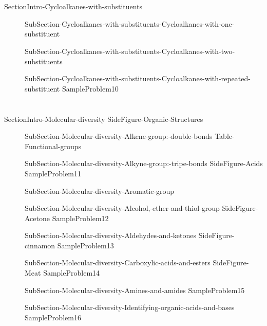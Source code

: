 \documentclass[main.tex]{subfiles}
\begin{document}
\section{\color{blue!30!black}{Cycloalkanes with substituents}}
{SectionIntro-Cycloalkanes-with-substituents}
\sloppy
\begin{description}
\item[]{SubSection-Cycloalkanes-with-substituents-Cycloalkanes-with-one-substituent}
\item[] {SubSection-Cycloalkanes-with-substituents-Cycloalkanes-with-two-substituents}
\item[]{SubSection-Cycloalkanes-with-substituents-Cycloalkanes-with-repeated-substituent}
{SampleProblem10}
\end{description}




\newpage
\section{\color{blue!30!black}{Molecular diversity}}
 {SectionIntro-Molecular-diversity}\sloppy
{SideFigure-Organic-Structures}
\begin{description}
\item[]{SubSection-Molecular-diversity-Alkene-group:-double-bonds}
{Table-Functional-groups}
\item[] {SubSection-Molecular-diversity-Alkyne-group:-tripe-bonds}
{SideFigure-Acids}
{SampleProblem11}
 \item[]{SubSection-Molecular-diversity-Aromatic-group}
\item[]{SubSection-Molecular-diversity-Alcohol,-ether-and-thiol-group}
{SideFigure-Acetone}
{SampleProblem12}
\item[] {SubSection-Molecular-diversity-Aldehydes-and-ketones}
{SideFigure-cinnamon}
{SampleProblem13}
\item[]{SubSection-Molecular-diversity-Carboxylic-acids-and-esters}
{SideFigure-Meat}
{SampleProblem14}
 \item[] {SubSection-Molecular-diversity-Amines-and-amides}
{SampleProblem15}
\item[]{SubSection-Molecular-diversity-Identifying-organic-acids-and-bases}
{SampleProblem16}

 \end{description}



\clearpage\thispagestyle{empty}\mbox{}\clearpage
\end{document}
